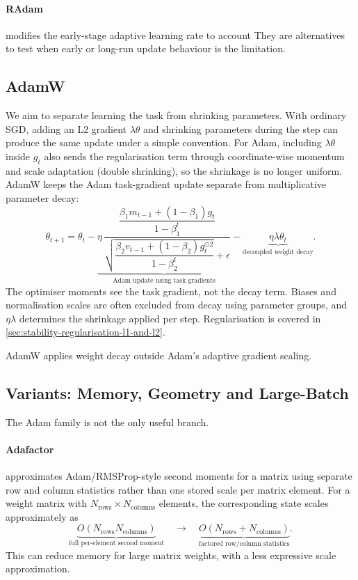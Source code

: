 \paragraph{RAdam} modifies the early-stage adaptive learning rate to account They are alternatives to test when early or long-run update behaviour is the limitation.

\subsection{AdamW}
\label{sec:optimisation-adamw-decouple-weight-decay-from-gradient-adaptation}
We aim to separate learning the task from shrinking parameters.
With ordinary SGD, adding an L2 gradient $\lambda\theta$ and shrinking parameters during the step can produce the same update under a simple convention.
For Adam, including $\lambda\theta$ inside $g_t$ also sends the regularisation term through coordinate-wise momentum and scale adaptation (double shrinking), so the shrinkage is no longer uniform.
AdamW keeps the Adam task-gradient update separate from multiplicative parameter decay:
\[
    \boxed{
    \theta_{t+1}=
    \theta_t
    -
    \underbrace{\eta\,
    \frac{
    \dfrac{\beta_1m_{t-1}+(1-\beta_1)g_t}{1-\beta_1^t}
    }{
    \sqrt{\dfrac{\beta_2v_{t-1}+(1-\beta_2)g_t^{\odot2}}{1-\beta_2^t}}+\epsilon
    }}_{\text{Adam update using task gradients}}
    -
    \underbrace{\eta\lambda\theta_t}_{\text{decoupled weight decay}}
    }.
\]
The optimiser moments see the task gradient, not the decay term.
Biases and normalisation scales are often excluded from decay using parameter groups, and $\eta\lambda$ determines the shrinkage applied per step.
Regularisation is covered in \cref{sec:stability-regularisation-l1-and-l2}.

\begin{calloutmemoryhook}
AdamW applies weight decay outside Adam's adaptive gradient scaling.
\end{calloutmemoryhook}

\subsection{Variants: Memory, Geometry and Large-Batch}
The Adam family is not the only useful branch.

\paragraph{Adafactor} approximates Adam/RMSProp-style second moments for a matrix using separate row and column statistics rather than one stored scale per matrix element.
For a weight matrix with $N_{\text{rows}}\times N_{\text{columns}}$ elements, the corresponding state scales approximately as
\[
    \underbrace{O(N_{\text{rows}}N_{\text{columns}})}_{\text{full per-element second moment}}
    \quad\longrightarrow\quad
    \underbrace{O(N_{\text{rows}}+N_{\text{columns}})}_{\text{factored row/column statistics}}.
\]
This can reduce memory for large matrix weights, with a less expressive scale approximation.

